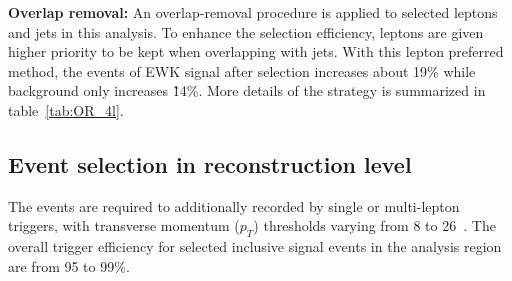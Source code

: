 \textbf{Overlap removal:} 
An overlap-removal procedure is applied to selected leptons and jets in this analysis.
To enhance the selection efficiency, leptons are given higher priority to be kept when overlapping with jets.
With this lepton preferred method, the events of EWK signal after selection increases about 19\% while background only increases \~ 14\%.
More details of the strategy is summarized in table~\ref{tab:OR_4l}.
\begin{table}[htbp]
\begin{center}
\renewcommand\arraystretch{1.8}
\end{center}
\caption{Overlap removal criteria between pre-selection objects for the \llll channel. The overlap removal follows the order shown in this table. Once an object has been marked as removed, it does not participate in the subsequent stages of the overlap removal procedure. }
\label{tab:OR_4l}
\end{table}

\subsection{Event selection in reconstruction level}

The events are required to additionally recorded by single or multi-lepton triggers, with transverse momentum ($p_{T}$) thresholds varying from 8 to 26~\gev.
The overall trigger efficiency for selected inclusive \lllljj signal events in the analysis region are from 95 to 99\%.

